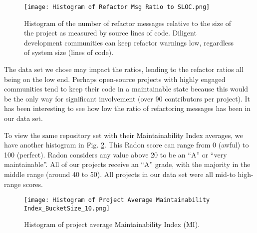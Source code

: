 \begin{figure}[ht]
  \centerline{
    \texttt{[image: Histogram of Refactor Msg Ratio to SLOC.png]}
  }
  \caption{Histogram of the number of refactor messages relative to the size of the project as measured by source lines of code. Diligent development communities can keep refactor warnings low, regardless of system size (lines of code).}
  \label{figHistogramRefactorRatio}
\end{figure}

The data set we chose may impact the ratios, lending to the refactor ratios all being on the low end. Perhaps open-source projects with highly engaged communities tend to keep their code in a maintainable state because this would be the only way for significant involvement (over 90 contributors per project). It has been interesting to see how low the ratio of refactoring messages has been in our data set.

To view the same repository set with their Maintainability Index averages, we have another histogram in Fig. \ref{figHistogramAvgMI}. This Radon score can range from 0 (awful) to 100 (perfect). Radon considers any value above 20 to be an ``A'' or ``very maintainable''. All of our projects receive an ``A'' grade, with the majority in the middle range (around 40 to 50). All projects in our data set were all mid-to high-range scores.

\begin{figure}[ht]
  \centerline{
    \texttt{[image: Histogram of Project Average Maintainability Index\_BucketSize\_10.png]}
  }
  \caption{Histogram of project average Maintainability Index (MI).}
  \label{figHistogramAvgMI}
\end{figure}

